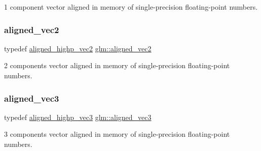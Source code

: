 1 component vector aligned in memory of single-\/precision floating-\/point numbers. 

\mbox{\label{group__gtc__type__aligned_ga8f4a38f220c72d218dbdc7bc1d06a1a2}} 
\subsubsection{\texorpdfstring{aligned\+\_\+vec2}{aligned\_vec2}}
{\footnotesize\ttfamily typedef \hyperlink{group__gtc__type__aligned_ga7467c1a16f31911de3b927338434af6d}{aligned\+\_\+highp\+\_\+vec2} \hyperlink{group__gtc__type__aligned_ga8f4a38f220c72d218dbdc7bc1d06a1a2}{glm\+::aligned\+\_\+vec2}}



2 components vector aligned in memory of single-\/precision floating-\/point numbers. 

\mbox{\label{group__gtc__type__aligned_ga9c54536a3becfd10a44f6b1b8c4aa3d3}} 
\subsubsection{\texorpdfstring{aligned\+\_\+vec3}{aligned\_vec3}}
{\footnotesize\ttfamily typedef \hyperlink{group__gtc__type__aligned_ga9ddb18aa4936b5aa354fcefe179675af}{aligned\+\_\+highp\+\_\+vec3} \hyperlink{group__gtc__type__aligned_ga9c54536a3becfd10a44f6b1b8c4aa3d3}{glm\+::aligned\+\_\+vec3}}



3 components vector aligned in memory of single-\/precision floating-\/point numbers. 

\mbox{\label{group__gtc__type__aligned_gad26d520694d7b865507819c2d9f2b196}} 
